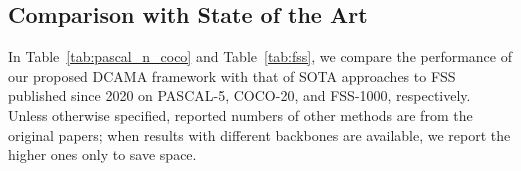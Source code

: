 \documentclass[runningheads,table,xcdraw]{llncs}
\begin{document}
\begin{table}[t]\color{blue}
  \caption{Performance on FSS-1000~\cite{li2020fss}.
  HSNet: our reimplementation based on the official codes.
  Bold and underlined numbers highlight the best and second best performance (if necessary) for each backbone, respectively.}\label{tab:fss}
  \centering
\end{table}

\subsection{Comparison with State of the Art}
In Table~\ref{tab:pascal_n_coco} and Table~\ref{tab:fss}, we compare the performance of our proposed DCAMA framework with that of SOTA approaches to FSS published since 2020 on PASCAL-5, COCO-20, and FSS-1000, respectively.
Unless otherwise specified, reported numbers of other methods are from the original papers;
when results with different backbones are available, we report the higher ones only to save space.
\end{document}
